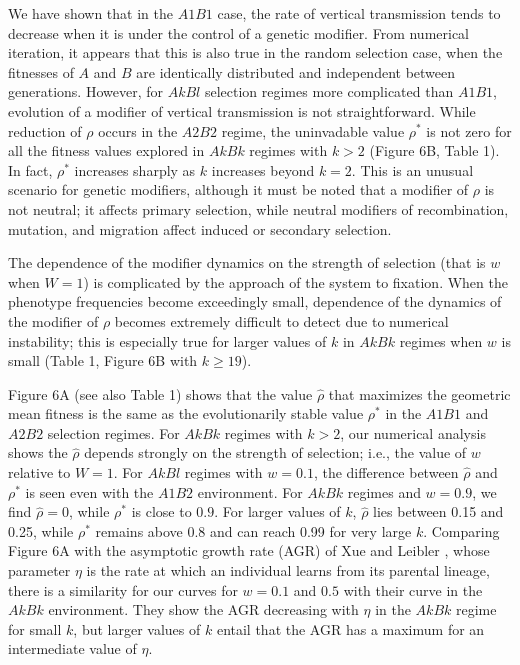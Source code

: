 \documentclass[9pt,twocolumn,twoside,lineno]{pnas-new}
\begin{document}
 We have shown that in the $A1B1$ case, the rate of vertical transmission tends to decrease when it is under the control of a genetic modifier. From numerical iteration, it appears that this is also true in the random selection case, when the fitnesses of $A$ and $B$ are identically distributed and independent between generations. However, for $AkBl$ selection regimes more complicated than $A1B1$, evolution of a modifier of vertical transmission is not straightforward. While reduction of $\rho$ occurs in the $A2B2$ regime, the uninvadable value $\rho^*$ is not zero for all the fitness values explored in $AkBk$ regimes with $k>2$ (Figure 6B, Table 1). In fact, $\rho^*$ increases sharply as $k$ increases beyond $k=2$. This is an unusual scenario for genetic modifiers, although it must be noted that a modifier of $\rho$ is not neutral; it affects primary selection, while neutral  modifiers of recombination, mutation, and migration affect induced or secondary selection.
 
 The dependence of the modifier dynamics on the strength of selection (that is $w$ when $W=1$) is complicated by the approach of the system to fixation. When the phenotype frequencies become exceedingly small, dependence of the dynamics of the modifier of $\rho$ becomes extremely difficult to detect due to numerical instability; this is especially true for larger values of $k$ in $AkBk$ regimes when $w$ is small (Table 1, Figure 6B with $k\ge 19$).
 
 Figure 6A (see also Table 1) shows that the value $\hat\rho$ that maximizes the geometric mean fitness is the same as the evolutionarily stable value $\rho^*$ in the $A1B1$ and $A2B2$ selection regimes. For $AkBk$ regimes with $k>2$, our numerical analysis shows the $\hat\rho$ depends strongly on the strength of selection; i.e., the value of $w$ relative to $W=1$. For $AkBl$ regimes with $w=0.1$, the difference between $\hat\rho$ and $\rho^*$ is seen even with the $A1B2$ environment. For $AkBk$ regimes and $w=0.9$, we find $\hat\rho=0$, while $\rho^*$ is close to $0.9$. For larger values of $k$, $\hat\rho$ lies between 0.15 and 0.25, while $\rho^*$ remains above 0.8 and can reach 0.99 for very large $k$. Comparing Figure 6A with the asymptotic growth rate (AGR) of Xue and Leibler \cite{xue2016evolutionary}, whose parameter $\eta$ is the rate at which an individual learns from its parental lineage, there is a similarity for our curves for $w=0.1$ and $0.5$ with their curve in the $AkBk$ environment. They show the AGR decreasing with $\eta$ in the $AkBk$ regime for small $k$, but larger values of $k$ entail that the AGR has a maximum for an intermediate value of $\eta$.
 
\end{document}
